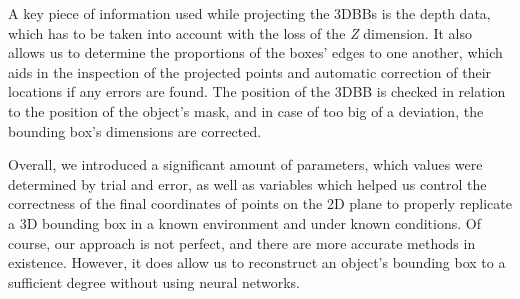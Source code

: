 A key piece of information used while projecting the 3DBBs is the depth data, which has to be taken into account with the loss of the \textit{Z} dimension. It also allows us to determine the proportions of the boxes' edges to one another, which aids in the inspection of the projected points and automatic correction of their locations if any errors are found. The position of the 3DBB is checked in relation to the position of the object's mask, and in case of too big of a deviation, the bounding box's dimensions are corrected. 

Overall, we introduced a significant amount of parameters, which values were determined by trial and error, as well as variables which helped us control the correctness of the final coordinates of points on the 2D plane to properly replicate a 3D bounding box in a known environment and under known conditions. Of course, our approach is not perfect, and there are more accurate methods in existence. However, it does allow us to reconstruct an object's bounding box to a sufficient degree without using neural networks.

